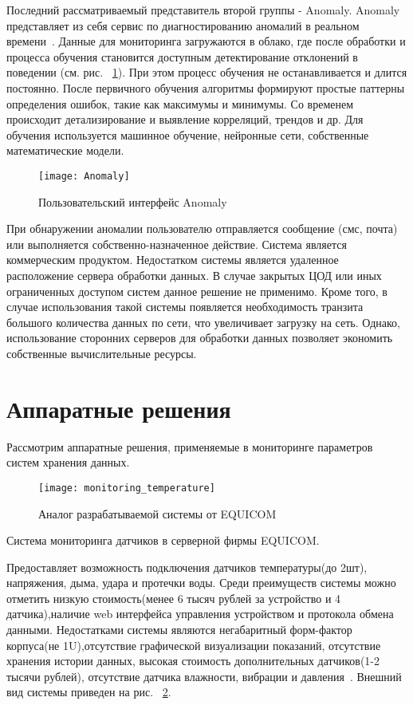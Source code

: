 Последний рассматриваемый представитель второй группы - Anomaly. Anomaly представляет из себя сервис по диагностированию аномалий в реальном времени~\cite{Anomaly}. Данные для мониторинга загружаются в облако, где после обработки и процесса обучения становится доступным детектирование отклонений в поведении (см. рис. ~\ref{fig:Anomaly}). При этом процесс обучения не останавливается и длится постоянно. После первичного обучения алгоритмы формируют простые паттерны определения ошибок, такие как максимумы и минимумы. Со временем происходит детализирование и выявление корреляций, трендов и др. Для обучения используется машинное обучение, нейронные сети, собственные математические модели. 
\begin{figure}[!h]
	\centering
	\texttt{[image: Anomaly]}
	\caption{Пользовательский интерфейс Anomaly}
	\label{fig:Anomaly}
\end{figure}

При обнаружении аномалии пользователю отправляется сообщение (смс, почта) или выполняется собственно-назначенное действие. Система является коммерческим продуктом. Недостатком системы является удаленное расположение сервера обработки данных. В случае закрытых ЦОД или иных ограниченных доступом систем данное решение не применимо. Кроме того, в случае использования такой системы появляется необходимость транзита большого количества данных по сети, что увеличивает загрузку на сеть. Однако, использование сторонних серверов для обработки данных позволяет экономить собственные вычислительные ресурсы. 

\section{Аппаратные решения}
Рассмотрим аппаратные решения, применяемые в мониторинге параметров систем хранения данных. 

\begin{figure}[!h]
	\centering
	\texttt{[image: monitoring\_temperature]}
	\caption{Аналог разрабатываемой системы от EQUICOM}
	\label{fig:monitoring_temperature}
\end{figure}

Система мониторинга датчиков в серверной фирмы EQUICOM.

Предоставляет возможность подключения датчиков температуры(до 2шт), напряжения, дыма, удара и протечки воды. Среди преимуществ системы можно отметить низкую стоимость(менее 6 тысяч рублей за устройство и 4 датчика),наличие web интерфейса управления устройством и протокола обмена данными. Недостатками системы являются негабаритный форм-фактор корпуса(не 1U),отсутствие графической визуализации показаний, отсутствие хранения истории  данных, высокая стоимость дополнительных датчиков(1-2 тысячи рублей), отсутствие датчика влажности, вибрации и давления~\cite{analog1}. Внешний вид системы приведен на рис. ~\ref{fig:monitoring_temperature}.

